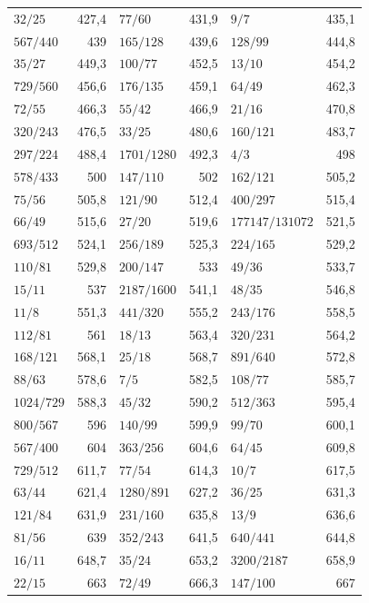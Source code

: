 {\begin{longtable}{l r @{\qquad} l r @{\qquad} l r}
$32/25$ & 427{,}4 & $77/60$ & 431{,}9 & $9/7$ & 435{,}1 \\
$567/440$ & 439 & $165/128$ & 439{,}6 & $128/99$ & 444{,}8 \\
$35/27$ & 449{,}3 & $100/77$ & 452{,}5 & $13/10$ & 454{,}2 \\
$729/560$ & 456{,}6 & $176/135$ & 459{,}1 & $64/49$ & 462{,}3 \\
$72/55$ & 466{,}3 & $55/42$ & 466{,}9 & $21/16$ & 470{,}8 \\
$320/243$ & 476{,}5 & $33/25$ & 480{,}6 & $160/121$ & 483{,}7 \\
$297/224$ & 488{,}4 & $1701/1280$ & 492{,}3 & $4/3$ & 498 \\
$578/433$ & 500 & $147/110$ & 502 & $162/121$ & 505{,}2 \\
$75/56$ & 505{,}8 & $121/90$ & 512{,}4 & $400/297$ & 515{,}4 \\
$66/49$ & 515{,}6 & $27/20$ & 519{,}6 & $177147/131072$ & 521{,}5 \\
$693/512$ & 524{,}1 & $256/189$ & 525{,}3 & $224/165$ & 529{,}2 \\
$110/81$ & 529{,}8 & $200/147$ & 533 & $49/36$ & 533{,}7 \\
$15/11$ & 537 & $2187/1600$ & 541{,}1 & $48/35$ & 546{,}8 \\
$11/8$ & 551{,}3 & $441/320$ & 555{,}2 & $243/176$ & 558{,}5 \\
$112/81$ & 561 & $18/13$ & 563{,}4 & $320/231$ & 564{,}2 \\
$168/121$ & 568{,}1 & $25/18$ & 568{,}7 & $891/640$ & 572{,}8 \\
$88/63$ & 578{,}6 & $7/5$ & 582{,}5 & $108/77$ & 585{,}7 \\
$1024/729$ & 588{,}3 & $45/32$ & 590{,}2 & $512/363$ & 595{,}4 \\
$800/567$ & 596 & $140/99$ & 599{,}9 & $99/70$ & 600{,}1 \\
$567/400$ & 604 & $363/256$ & 604{,}6 & $64/45$ & 609{,}8 \\
$729/512$ & 611{,}7 & $77/54$ & 614{,}3 & $10/7$ & 617{,}5 \\
$63/44$ & 621{,}4 & $1280/891$ & 627{,}2 & $36/25$ & 631{,}3 \\
$121/84$ & 631{,}9 & $231/160$ & 635{,}8 & $13/9$ & 636{,}6 \\
$81/56$ & 639 & $352/243$ & 641{,}5 & $640/441$ & 644{,}8 \\
$16/11$ & 648{,}7 & $35/24$ & 653{,}2 & $3200/2187$ & 658{,}9 \\
$22/15$ & 663 & $72/49$ & 666{,}3 & $147/100$ & 667 \\

\end{longtable}}
